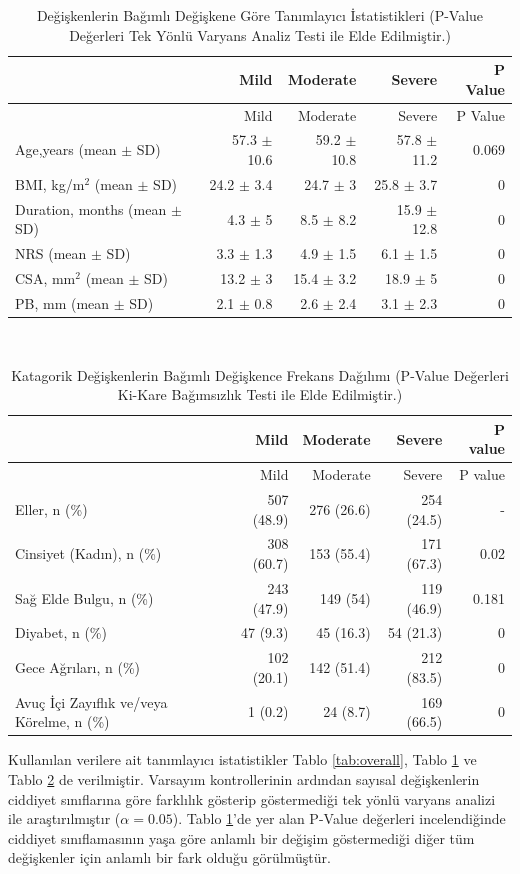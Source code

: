 \documentclass[12pt,twoside]{deuthesis}
\begin{document}
\begin{longtable}[]{@{}lrrrr@{}}
\caption{\label{tab:sayisal} Değişkenlerin Bağımlı Değişkene Göre Tanımlayıcı İstatistikleri \footnotesize (P-Value Değerleri Tek Yönlü Varyans Analiz Testi ile Elde Edilmiştir.)}\tabularnewline
\toprule
& Mild & Moderate & Severe & P Value \\
\midrule
\endfirsthead
\toprule
& Mild & Moderate & Severe & P Value \\
\midrule
\endhead
Age,years (mean \(\pm\) SD) & 57.3 \(\pm\) 10.6 & 59.2 \(\pm\) 10.8 & 57.8 \(\pm\) 11.2 & 0.069 \\
BMI, kg/m\(^2\) (mean \(\pm\) SD) & 24.2 \(\pm\) 3.4 & 24.7 \(\pm\) 3 & 25.8 \(\pm\) 3.7 & 0 \\
Duration, months (mean \(\pm\) SD) & 4.3 \(\pm\) 5 & 8.5 \(\pm\) 8.2 & 15.9 \(\pm\) 12.8 & 0 \\
NRS (mean \(\pm\) SD) & 3.3 \(\pm\) 1.3 & 4.9 \(\pm\) 1.5 & 6.1 \(\pm\) 1.5 & 0 \\
CSA, mm\(^2\) (mean \(\pm\) SD) & 13.2 \(\pm\) 3 & 15.4 \(\pm\) 3.2 & 18.9 \(\pm\) 5 & 0 \\
PB, mm (mean \(\pm\) SD) & 2.1 \(\pm\) 0.8 & 2.6 \(\pm\) 2.4 & 3.1 \(\pm\) 2.3 & 0 \\
\bottomrule
\end{longtable}
\hfill\break
\hfill\break
~
\begin{longtable}[]{@{}lrrrr@{}}
\caption{\label{tab:catvar} Katagorik Değişkenlerin Bağımlı Değişkence Frekans Dağılımı \footnotesize (P-Value Değerleri Ki-Kare Bağımsızlık Testi ile Elde Edilmiştir.)}\tabularnewline
\toprule
& Mild & Moderate & Severe & P value \\
\midrule
\endfirsthead
\toprule
& Mild & Moderate & Severe & P value \\
\midrule
\endhead
Eller, n (\%) & 507 (48.9) & 276 (26.6) & 254 (24.5) & - \\
Cinsiyet (Kadın), n (\%) & 308 (60.7) & 153 (55.4) & 171 (67.3) & 0.02 \\
Sağ Elde Bulgu, n (\%) & 243 (47.9) & 149 (54) & 119 (46.9) & 0.181 \\
Diyabet, n (\%) & 47 (9.3) & 45 (16.3) & 54 (21.3) & 0 \\
Gece Ağrıları, n (\%) & 102 (20.1) & 142 (51.4) & 212 (83.5) & 0 \\
Avuç İçi Zayıflık ve/veya Körelme, n (\%) & 1 (0.2) & 24 (8.7) & 169 (66.5) & 0 \\
\bottomrule
\end{longtable}
Kullanılan verilere ait tanımlayıcı istatistikler Tablo \ref{tab:overall}, Tablo \ref{tab:sayisal} ve Tablo \ref{tab:catvar} de verilmiştir. Varsayım kontrollerinin ardından sayısal değişkenlerin ciddiyet sınıflarına göre farklılık gösterip göstermediği tek yönlü varyans analizi ile araştırılmıştır (\(\alpha = 0.05\)). Tablo \ref{tab:sayisal}'de yer alan P-Value değerleri incelendiğinde ciddiyet sınıflamasının yaşa göre anlamlı bir değişim göstermediği diğer tüm değişkenler için anlamlı bir fark olduğu görülmüştür.
\end{document}
